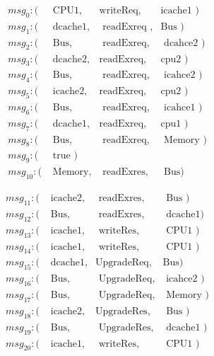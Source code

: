 \documentclass[12pt,frontmatter,copyright,thesis]{usfmanus}
\begin{document}
\begin{appendix}
\begin{figure}[h]
\begin{minipage}{.5\textwidth}
 {\footnotesize
 \[
 \begin{array}{llll}
 msg_0: (&\mbox{ CPU1},&\mbox{writeReq},&\mbox{icache1   })\\       
 msg_1: (&\mbox{ dcache1},&\mbox{ readExreq },&\mbox{Bus     })\\        
 msg_2: (&\mbox{ Bus},&\mbox{ readExreq},&\mbox{ dcahce2 })\\  
 msg_3: (&\mbox{ dcache2},&\mbox{readExreq},&\mbox{cpu2         })\\   
 msg_4: (&\mbox{ Bus},&\mbox{ readExreq},&\mbox{ icahce2           })\\  
 msg_5: (&\mbox{ icache2},&\mbox{readExreq},&\mbox{cpu2 })\\  
 msg_6: (&\mbox{ Bus},&\mbox{ readExreq},&\mbox{ icahce1       })\\     
 msg_7: (&\mbox{ dcache1},&\mbox{readExreq},&\mbox{cpu1           })\\  
 msg_8: (&\mbox{ Bus},&\mbox{ readExreq},&\mbox{ Memory })\\  
 msg_9: (&\mbox{ true                                          })\\  
 msg_{10}: (&\mbox{ Memory},&\mbox{ readExres},&\mbox{ Bus})
  \end{array}
 \]}
\end{minipage}
\begin{minipage}{.5\textwidth}
 {\footnotesize
 \[
 \begin{array}{llll}
 msg_{11}: (&\mbox{ icache2},&\mbox{ readExres},&\mbox{ Bus })\\  
 msg_{12}: (&\mbox{ Bus},&\mbox{ readExres},&\mbox{ dcache1})\\  
 msg_{13}: (&\mbox{ icache1},&\mbox{ writeRes},&\mbox{ CPU1         })\\  
 msg_{14}: (&\mbox{ icache1},&\mbox{ writeRes},&\mbox{ CPU1 })\\  
 msg_{15}: (&\mbox{ dcache1},&\mbox{UpgradeReq},&\mbox{Bus})\\  
 msg_{16}: (&\mbox{ Bus},&\mbox{ UpgradeReq},&\mbox{ icahce2      })\\   
 msg_{17}: (&\mbox{ Bus},&\mbox{ UpgradeReq},&\mbox{ Memory })\\  
 msg_{18}: (&\mbox{ icache2},&\mbox{UpgradeRes},&\mbox{ Bus     })\\  
 msg_{19}: (&\mbox{ Bus},&\mbox{ UpgradeRes},&\mbox{ dcache1      })\\  
 msg_{20}: (&\mbox{ icache1},&\mbox{ writeRes},&\mbox{ CPU1 })\\

\end{array}\]}
\end{minipage}
\end{figure}
\end{appendix}
\end{document}
